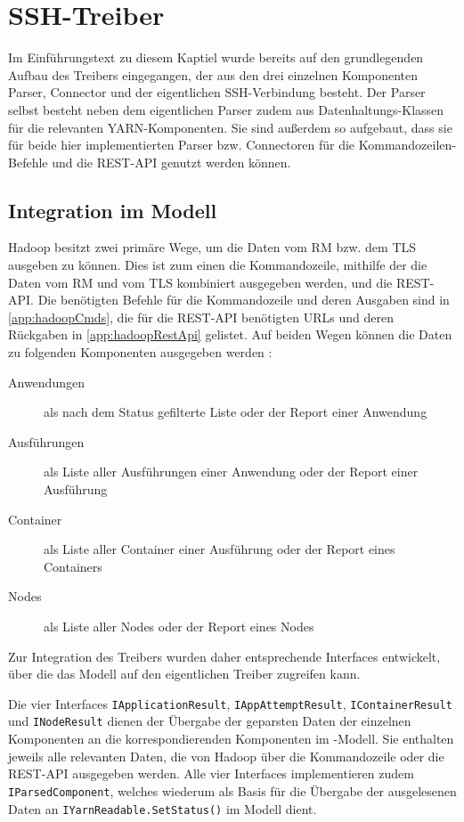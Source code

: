 \section{SSH-Treiber}\label{sec:sshDriver}

Im Einführungstext zu diesem Kaptiel wurde bereits auf den grundlegenden Aufbau des Treibers eingegangen, der aus den drei einzelnen Komponenten Parser, Connector und der eigentlichen SSH-Verbindung besteht. Der Parser selbst besteht neben dem eigentlichen Parser zudem aus Datenhaltungs-Klassen für die relevanten YARN-Komponenten. Sie sind außerdem so aufgebaut, dass sie für beide hier implementierten Parser bzw. Connectoren für die Kommandozeilen-Befehle und die REST-API genutzt werden können.

\subsection{Integration im Modell}\label{sec:modelIntegration}

Hadoop besitzt zwei primäre Wege, um die Daten vom \ac{RM} bzw. dem \ac{TLS} ausgeben zu können. Dies ist zum einen die Kommandozeile, mithilfe der die Daten vom \ac{RM} und vom \ac{TLS} kombiniert ausgegeben werden, und die REST-API. Die benötigten Befehle für die Kommandozeile und deren Ausgaben sind in \autoref{app:hadoopCmds}, die für die REST-API benötigten URLs und deren Rückgaben in \autoref{app:hadoopRestApi} gelistet. Auf beiden Wegen können \uA die Daten zu folgenden Komponenten ausgegeben werden \cite{HadoopYarnTlServer271,HadoopYarnCmds271,HadoopRmApi271,HadoopNmApi271}:

\begin{description}
    \item[Anwendungen] als nach dem Status gefilterte Liste oder der Report einer Anwendung
    \item[Ausführungen] als Liste aller Ausführungen einer Anwendung oder der Report einer Ausführung
    \item[Container] als Liste aller Container einer Ausführung oder der Report eines Containers
    \item[Nodes] als Liste aller Nodes oder der Report eines Nodes
\end{description}

Zur Integration des Treibers wurden daher entsprechende Interfaces entwickelt, über die das Modell auf den eigentlichen Treiber zugreifen kann.

Die vier Interfaces \texttt{IApplicationResult}, \texttt{IAppAttemptResult}, \texttt{IContainerResult} und \texttt{INodeResult} dienen der Übergabe der geparsten Daten der einzelnen Komponenten an die korrespondierenden Komponenten im \sS-Modell. Sie enthalten jeweils alle relevanten Daten, die von Hadoop über die Kommandozeile oder die REST-API ausgegeben werden. Alle vier Interfaces implementieren zudem \texttt{IParsedComponent}, welches wiederum als Basis für die Übergabe der ausgelesenen Daten an \texttt{IYarnReadable.SetStatus()} im Modell dient.

